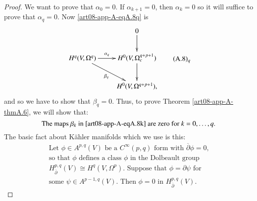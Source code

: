 \begin{proof}
We want to prove that $\alpha_{0}=0$. If $\alpha_{k+1}=0$, then $\alpha_{k}=0$ so it will suffice to prove that $\alpha_{q}=0$. Now \ref{art08-app-A-eqA.8q} is
\begin{equation*}
\vcenter{\xymatrix{
 & 0\ar[d]\\
H^{q}(V,\Omega^{q})\ar[dr]_-{\beta_{q}}\ar[r]^-{\alpha_{q}} & H^{0}(V,\Omega^{q+p+1}_{c})\ar[d]\\
 & H^{0}(V,\Omega^{q+p+1}),
}}\tag*{(A.8)$_{q}$}\label{art08-app-A-eqA.8q}
\end{equation*}
and so we have to show that $\beta_{q}=0$. Thus, to prove Theorem \ref{art08-app-A-thmA.6}, we will show that:
\setcounter{equation}{8}
\begin{equation}
\text{The maps $\beta_{k}$ in \ref{art08-app-A-eqA.8k} are zero for } k=0,\ldots,q.\label{art08-app-A-eqA.9}
\end{equation}
The basic fact about K\"ahler manifolds which we use is this:
\begin{equation}
\begin{array}{l}
\text{Let $\phi\in A^{p,q}(V)$ be a $C^{\infty}(p,q)$ form with $\overline{\partial}\phi=0$,}\\
\text{so that $\phi$ defines a class $\phi$ in the Dolbeault group}\\
\text{$H^{p,q}_{\overline{\partial}}(V)\cong H^{q}(V,\Omega^{p})$. Suppose that $\phi=\partial\psi$ for}\\
\text{some $\psi\in A^{p-1,q}(V)$. Then $\phi=0$ in $H^{p,q}_{\overline{\partial}}(V)$.}
\end{array}\label{art08-app-A-eqA.10}
\end{equation}
\end{proof}

